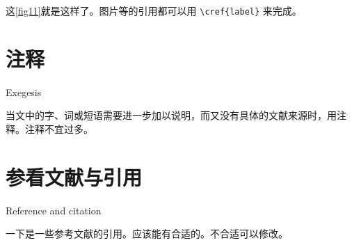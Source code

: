 这\cref{fig11}就是这样了。图片等的引用都可以用 \verb|\cref{label}| 来完成。


\section{注释}{Exegesis}

当文中的字、词或短语需要进一步加以说明，而又没有具体的文献来源时，用注释。注释不宜过多。

\section{参看文献与引用}{Reference and citation}

一下是一些参考文献的引用。应该能有合适的。不合适可以修改。


\cite{liuhaiyang2013latex,CTEX}

\cite{XMU}

\citet{liuhaiyang2013latex}

\citep{liuhaiyang2013latex}

\citealt{liuhaiyang2013latex}

\citeauthor{liuhaiyang2013latex}

\citeyearpar{liuhaiyang2013latex}
